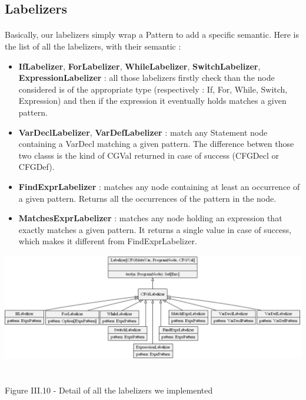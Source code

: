 \documentclass{report}
\begin{document}
\subsection* {Labelizers}
\paragraph{}
\hspace{4mm}Basically, our labelizers simply wrap a Pattern to add a specific semantic. Here is the list of all the labelizers, with their semantic :

\vspace{1.5mm}
\begin{itemize}
\item \textbf{IfLabelizer}, \textbf{ForLabelizer}, \textbf{WhileLabelizer}, \textbf{SwitchLabelizer}, \textbf{ExpressionLabelizer} :
all those labelizers firstly check than the node considered is of the appropriate type (respectively : If, For, While, Switch, Expression) and then if the expression
it eventually holds matches a given pattern.\vspace{1mm}
\item \textbf{VarDeclLabelizer}, \textbf{VarDefLabelizer} : match any Statement node containing a VarDecl matching a given pattern. The difference betwen those two classs is the kind of CGVal returned
in case of success (CFGDecl or CFGDef).\vspace{1mm}
\item \textbf{FindExprLabelizer} : matches any node containing at least an occurrence of a given pattern. Returns all the occurrences of the pattern in the node.\vspace{1mm}
\item \textbf{MatchesExprLabelizer} : matches any node holding an expression that exactly matches a given pattern. It returns a single value in case of success, which makes it different from FindExprLabelizer.\vspace{1mm}
\end{itemize}

\begin{center}
\includegraphics[scale=0.55]{data/labels.png}
~\\~\\Figure III.10 - Detail of all the labelizers we implemented
\end{center}
\end{document}
